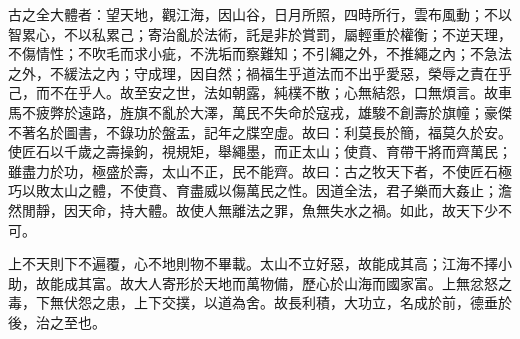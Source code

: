 
\begin{pinyinscope}
古之全大體者：望天地，觀江海，因山谷，日月所照，四時所行，雲布風動；不以智累心，不以私累己；寄治亂於法術，託是非於賞罰，屬輕重於權衡；不逆天理，不傷情性；不吹毛而求小疵，不洗垢而察難知；不引繩之外，不推繩之內；不急法之外，不緩法之內；守成理，因自然；禍福生乎道法而不出乎愛惡，榮辱之責在乎己，而不在乎人。故至安之世，法如朝露，純樸不散；心無結怨，口無煩言。故車馬不疲弊於遠路，旌旗不亂於大澤，萬民不失命於寇戎，雄駿不創壽於旗幢；豪傑不著名於圖書，不錄功於盤盂，記年之牒空虛。故曰：利莫長於簡，福莫久於安。使匠石以千歲之壽操鉤，視規矩，舉繩墨，而正太山；使賁、育帶干將而齊萬民；雖盡力於功，極盛於壽，太山不正，民不能齊。故曰：古之牧天下者，不使匠石極巧以敗太山之體，不使賁、育盡威以傷萬民之性。因道全法，君子樂而大姦止；澹然閒靜，因天命，持大體。故使人無離法之罪，魚無失水之禍。如此，故天下少不可。

上不天則下不遍覆，心不地則物不畢載。太山不立好惡，故能成其高；江海不擇小助，故能成其富。故大人寄形於天地而萬物備，歷心於山海而國家富。上無忿怒之毒，下無伏怨之患，上下交撲，以道為舍。故長利積，大功立，名成於前，德垂於後，治之至也。


\end{pinyinscope}